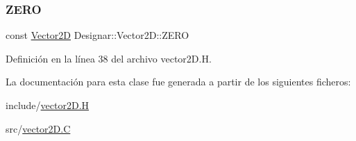 \subsubsection{\texorpdfstring{Z\+E\+RO}{ZERO}}
{\footnotesize\ttfamily const \hyperlink{class_designar_1_1_vector2_d}{Vector2D} Designar\+::\+Vector2\+D\+::\+Z\+E\+RO\hspace{0.3cm}{\ttfamily [static]}}



Definición en la línea 38 del archivo vector2\+D.\+H.



La documentación para esta clase fue generada a partir de los siguientes ficheros\+:\begin{DoxyCompactItemize}
\item 
include/\hyperlink{vector2_d_8_h}{vector2\+D.\+H}\item 
src/\hyperlink{vector2_d_8_c}{vector2\+D.\+C}\end{DoxyCompactItemize}
